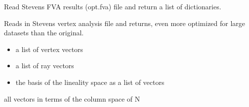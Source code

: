 \documentclass[letterpaper,12pt,english]{sphinxmanual}
\begin{document}
\begin{fulllineitems}

\pysigstartsignatures
\pysiglinewithargsret
{}
{\sphinxparamcomma {}}
{}
\pysigstopsignatures
\end{fulllineitems}



\begin{fulllineitems}

\pysigstartsignatures
\pysiglinewithargsret
{}
{}
{}
\pysigstopsignatures
\sphinxAtStartPar
Read Stevens FVA results (opt.fva) file and return a list of dictionaries.

\end{fulllineitems}



\begin{fulllineitems}

\pysigstartsignatures
\pysiglinewithargsret
{}
{\sphinxparamcomma {}\sphinxparamcomma {}\sphinxparamcomma {}\sphinxparamcomma {}}
{}
\pysigstopsignatures
\sphinxAtStartPar
Reads in Stevens vertex analysis file and returns, even more optimized for large
datasets than the original.
\begin{itemize}
\item {} 
\sphinxAtStartPar
a list of vertex vectors

\item {} 
\sphinxAtStartPar
a list of ray vectors

\item {} 
\sphinxAtStartPar
the basis of the lineality space as a list of vectors

\end{itemize}

\sphinxAtStartPar
all vectors in terms of the column space of N

\end{fulllineitems}
\end{document}
